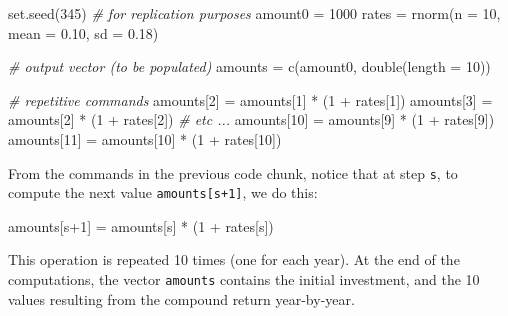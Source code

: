 \documentclass[
]{book}
\newenvironment{Shaded}{\begin{snugshade}}{\end{snugshade}}
\newcommand{\AttributeTok}[1]{\textcolor[rgb]{0.77,0.63,0.00}{#1}}
\newcommand{\CommentTok}[1]{\textcolor[rgb]{0.56,0.35,0.01}{\textit{#1}}}
\newcommand{\DecValTok}[1]{\textcolor[rgb]{0.00,0.00,0.81}{#1}}
\newcommand{\FloatTok}[1]{\textcolor[rgb]{0.00,0.00,0.81}{#1}}
\newcommand{\FunctionTok}[1]{\textcolor[rgb]{0.00,0.00,0.00}{#1}}
\newcommand{\NormalTok}[1]{#1}
\newcommand{\OtherTok}[1]{\textcolor[rgb]{0.56,0.35,0.01}{#1}}
\newcommand{\SpecialCharTok}[1]{\textcolor[rgb]{0.00,0.00,0.00}{#1}}
\begin{document}
\begin{Shaded}
\begin{Highlighting}[]
\FunctionTok{set.seed}\NormalTok{(}\DecValTok{345}\NormalTok{)    }\CommentTok{\# for replication purposes}
\NormalTok{amount0 }\OtherTok{=} \DecValTok{1000}
\NormalTok{rates }\OtherTok{=} \FunctionTok{rnorm}\NormalTok{(}\AttributeTok{n =} \DecValTok{10}\NormalTok{, }\AttributeTok{mean =} \FloatTok{0.10}\NormalTok{, }\AttributeTok{sd =} \FloatTok{0.18}\NormalTok{)}

\CommentTok{\# output vector (to be populated)}
\NormalTok{amounts }\OtherTok{=} \FunctionTok{c}\NormalTok{(amount0, }\FunctionTok{double}\NormalTok{(}\AttributeTok{length =} \DecValTok{10}\NormalTok{))}

\CommentTok{\# repetitive commands}
\NormalTok{amounts[}\DecValTok{2}\NormalTok{] }\OtherTok{=}\NormalTok{ amounts[}\DecValTok{1}\NormalTok{] }\SpecialCharTok{*}\NormalTok{ (}\DecValTok{1} \SpecialCharTok{+}\NormalTok{ rates[}\DecValTok{1}\NormalTok{])}
\NormalTok{amounts[}\DecValTok{3}\NormalTok{] }\OtherTok{=}\NormalTok{ amounts[}\DecValTok{2}\NormalTok{] }\SpecialCharTok{*}\NormalTok{ (}\DecValTok{1} \SpecialCharTok{+}\NormalTok{ rates[}\DecValTok{2}\NormalTok{])}
\CommentTok{\# etc ...}
\NormalTok{amounts[}\DecValTok{10}\NormalTok{] }\OtherTok{=}\NormalTok{ amounts[}\DecValTok{9}\NormalTok{] }\SpecialCharTok{*}\NormalTok{ (}\DecValTok{1} \SpecialCharTok{+}\NormalTok{ rates[}\DecValTok{9}\NormalTok{])}
\NormalTok{amounts[}\DecValTok{11}\NormalTok{] }\OtherTok{=}\NormalTok{ amounts[}\DecValTok{10}\NormalTok{] }\SpecialCharTok{*}\NormalTok{ (}\DecValTok{1} \SpecialCharTok{+}\NormalTok{ rates[}\DecValTok{10}\NormalTok{])}
\end{Highlighting}
\end{Shaded}

From the commands in the previous code chunk, notice that at step \texttt{s}, to
compute the next value \texttt{amounts{[}s+1{]}}, we do this:

\begin{Shaded}
\begin{Highlighting}[]
\NormalTok{amounts[s}\SpecialCharTok{+}\DecValTok{1}\NormalTok{] }\OtherTok{=}\NormalTok{ amounts[s] }\SpecialCharTok{*}\NormalTok{ (}\DecValTok{1} \SpecialCharTok{+}\NormalTok{ rates[s])}
\end{Highlighting}
\end{Shaded}

This operation is repeated 10 times (one for each year). At the end of the
computations, the vector \texttt{amounts} contains the initial investment, and the 10
values resulting from the compound return year-by-year.
\end{document}
